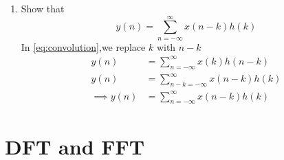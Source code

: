 \documentclass[journal,12pt,twocolumn]{IEEEtran}
\theoremstyle{remark}
\begin{document}
\begin{enumerate}[label=\thesection.\arabic*]
\item Show that
\begin{equation}
y(n) =  \sum_{n=-\infty}^{\infty}x(n-k)h(k)
\end{equation}
\solution In \eqref{eq:convolution},we replace $k$ with $n-k$
\begin{align}
    y(n) &= \sum_{n=-\infty}^{\infty}x(k)h(n-k) \\
    y(n) &= \sum_{n-k=-\infty}^{\infty}x(n-k)h(k) \\
    \implies y(n) &= \sum_{n=-\infty}^{\infty}x(n-k)h(k)
\end{align}
\end{enumerate}

\section{DFT and FFT}
\end{document}
